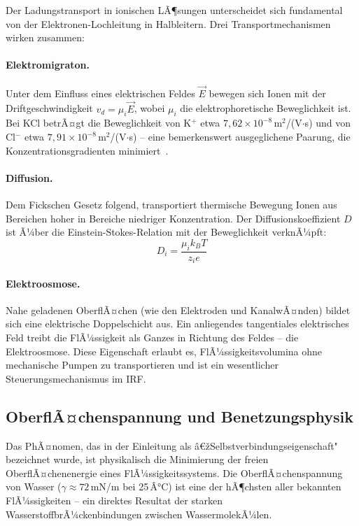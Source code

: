 ﻿\documentclass[a4paper,12pt]{scrreprt}
\theoremstyle{definition}
\begin{document}
Der Ladungstransport in ionischen LÃ¶sungen unterscheidet sich fundamental
von der Elektronen-Lochleitung in Halbleitern. Drei Transportmechanismen
wirken zusammen:

\paragraph{Elektromigraton.}
Unter dem Einfluss eines elektrischen Feldes $\vec{E}$ bewegen sich Ionen
mit der Driftgeschwindigkeit $v_d = \mu_i \vec{E}$, wobei $\mu_i$ die
elektrophoretische Beweglichkeit ist. Bei KCl betrÃ¤gt die Beweglichkeit von
K$^+$ etwa $7{,}62 \times 10^{-8}$\,m$^2$/(V$\cdot$s) und von Cl$^-$ etwa
$7{,}91 \times 10^{-8}$\,m$^2$/(V$\cdot$s) -- eine bemerkenswert ausgeglichene
Paarung, die Konzentrationsgradienten minimiert~\cite{atkins2018}.

\paragraph{Diffusion.}
Dem Fickschen Gesetz folgend, transportiert thermische Bewegung Ionen aus
Bereichen hoher in Bereiche niedriger Konzentration. Der Diffusionskoeffizient
$D$ ist Ã¼ber die Einstein-Stokes-Relation mit der Beweglichkeit verknÃ¼pft:
\begin{equation}
	D_i = \frac{\mu_i k_B T}{z_i e}
	\label{eq:einstein_stokes}
\end{equation}

\paragraph{Elektroosmose.}
Nahe geladenen OberflÃ¤chen (wie den Elektroden und KanalwÃ¤nden) bildet sich
eine elektrische Doppelschicht aus. Ein anliegendes tangentiales elektrisches
Feld treibt die FlÃ¼ssigkeit als Ganzes in Richtung des Feldes -- die
Elektroosmose. Diese Eigenschaft erlaubt es, FlÃ¼ssigkeitsvolumina ohne
mechanische Pumpen zu transportieren und ist ein wesentlicher
Steuerungsmechanismus im IRF.

\subsection{OberflÃ¤chenspannung und Benetzungsphysik}

Das PhÃ¤nomen, das in der Einleitung als â€žSelbstverbindungseigenschaft"
bezeichnet wurde, ist physikalisch die Minimierung der freien OberflÃ¤chenenergie
eines FlÃ¼ssigkeitssystems. Die OberflÃ¤chenspannung von Wasser
($\gamma \approx 72$\,mN/m bei 25\,Â°C) ist eine der hÃ¶chsten aller bekannten
FlÃ¼ssigkeiten -- ein direktes Resultat der starken WasserstoffbrÃ¼ckenbindungen
zwischen WassermolekÃ¼len.
\end{document}
